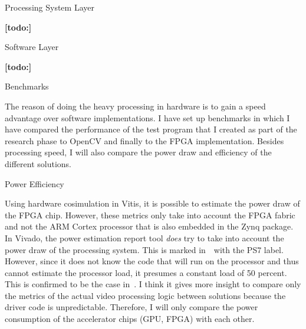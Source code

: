 \documentclass{matthijs}
\begin{document}
	\begin{hoofdstuk}{Processing System Layer}

		\textbf{[todo:]}

	\end{hoofdstuk}
	
	\begin{hoofdstuk}{Software Layer}

		\textbf{[todo:]}

	\end{hoofdstuk}

	\begin{hoofdstuk}{Benchmarks}

		The reason of doing the heavy processing in hardware is to gain a speed advantage over software implementations.
		I have set up benchmarks in which I have compared the performance of the test program that I created as part of the research phase to OpenCV and finally to the FPGA implementation.
		Besides processing speed, I will also compare the power draw and efficiency of the different solutions.

		\begin{paragraaf}{Power Efficiency}

			Using hardware cosimulation in Vitis, it is possible to estimate the power draw of the FPGA chip.
			However, these metrics only take into account the FPGA fabric and not the ARM Cortex processor that is also embedded in the Zynq package.
			In Vivado, the power estimation report tool \textit{does} try to take into account the power draw of the processing system.
			This is marked in~~with the PS7 label.
			However, since it does not know the code that will run on the processor and thus cannot estimate the processor load, it presumes a constant load of 50 percent.
			This is confirmed to be the case in~.
			I think it gives more insight to compare only the metrics of the actual video processing logic between solutions because the driver code is unpredictable.
			Therefore, I will only compare the power consumption of the accelerator chips (GPU, FPGA) with each other.


\end{paragraaf}
\end{hoofdstuk}
\end{document}
